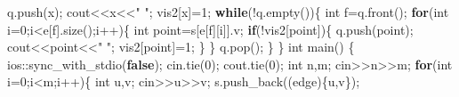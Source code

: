 \documentclass[
]{article}
\newenvironment{Shaded}{}{}
\newcommand{\ControlFlowTok}[1]{\textcolor[rgb]{0.00,0.44,0.13}{\textbf{#1}}}
\newcommand{\DataTypeTok}[1]{\textcolor[rgb]{0.56,0.13,0.00}{#1}}
\newcommand{\DecValTok}[1]{\textcolor[rgb]{0.25,0.63,0.44}{#1}}
\newcommand{\KeywordTok}[1]{\textcolor[rgb]{0.00,0.44,0.13}{\textbf{#1}}}
\newcommand{\NormalTok}[1]{#1}
\newcommand{\OperatorTok}[1]{\textcolor[rgb]{0.40,0.40,0.40}{#1}}
\newcommand{\StringTok}[1]{\textcolor[rgb]{0.25,0.44,0.63}{#1}}
\begin{document}
\begin{Shaded}
\begin{Highlighting}[]
\NormalTok{	q}\OperatorTok{.}\NormalTok{push}\OperatorTok{(}\NormalTok{x}\OperatorTok{);}
\NormalTok{	cout}\OperatorTok{\textless{}\textless{}}\NormalTok{x}\OperatorTok{\textless{}\textless{}}\StringTok{" "}\OperatorTok{;}
\NormalTok{	vis2}\OperatorTok{[}\NormalTok{x}\OperatorTok{]=}\DecValTok{1}\OperatorTok{;}
	\ControlFlowTok{while}\OperatorTok{(!}\NormalTok{q}\OperatorTok{.}\NormalTok{empty}\OperatorTok{())\{}
		\DataTypeTok{int}\NormalTok{ f}\OperatorTok{=}\NormalTok{q}\OperatorTok{.}\NormalTok{front}\OperatorTok{();}
		\ControlFlowTok{for}\OperatorTok{(}\DataTypeTok{int}\NormalTok{ i}\OperatorTok{=}\DecValTok{0}\OperatorTok{;}\NormalTok{i}\OperatorTok{\textless{}}\NormalTok{e}\OperatorTok{[}\NormalTok{f}\OperatorTok{].}\NormalTok{size}\OperatorTok{();}\NormalTok{i}\OperatorTok{++)\{}
			\DataTypeTok{int}\NormalTok{ point}\OperatorTok{=}\NormalTok{s}\OperatorTok{[}\NormalTok{e}\OperatorTok{[}\NormalTok{f}\OperatorTok{][}\NormalTok{i}\OperatorTok{]].}\NormalTok{v}\OperatorTok{;}
			\ControlFlowTok{if}\OperatorTok{(!}\NormalTok{vis2}\OperatorTok{[}\NormalTok{point}\OperatorTok{])\{}
\NormalTok{				q}\OperatorTok{.}\NormalTok{push}\OperatorTok{(}\NormalTok{point}\OperatorTok{);}
\NormalTok{				cout}\OperatorTok{\textless{}\textless{}}\NormalTok{point}\OperatorTok{\textless{}\textless{}}\StringTok{" "}\OperatorTok{;}
\NormalTok{				vis2}\OperatorTok{[}\NormalTok{point}\OperatorTok{]=}\DecValTok{1}\OperatorTok{;}
			\OperatorTok{\}}
		\OperatorTok{\}}
\NormalTok{		q}\OperatorTok{.}\NormalTok{pop}\OperatorTok{();}
	\OperatorTok{\}}
\OperatorTok{\}}
\DataTypeTok{int}\NormalTok{ main}\OperatorTok{()}
\OperatorTok{\{}
\NormalTok{	ios}\OperatorTok{::}\NormalTok{sync\_with\_stdio}\OperatorTok{(}\KeywordTok{false}\OperatorTok{);}\NormalTok{ cin}\OperatorTok{.}\NormalTok{tie}\OperatorTok{(}\DecValTok{0}\OperatorTok{);}\NormalTok{ cout}\OperatorTok{.}\NormalTok{tie}\OperatorTok{(}\DecValTok{0}\OperatorTok{);}
	\DataTypeTok{int}\NormalTok{ n}\OperatorTok{,}\NormalTok{m}\OperatorTok{;}
\NormalTok{	cin}\OperatorTok{\textgreater{}\textgreater{}}\NormalTok{n}\OperatorTok{\textgreater{}\textgreater{}}\NormalTok{m}\OperatorTok{;}
	\ControlFlowTok{for}\OperatorTok{(}\DataTypeTok{int}\NormalTok{ i}\OperatorTok{=}\DecValTok{0}\OperatorTok{;}\NormalTok{i}\OperatorTok{\textless{}}\NormalTok{m}\OperatorTok{;}\NormalTok{i}\OperatorTok{++)\{}
		\DataTypeTok{int}\NormalTok{ u}\OperatorTok{,}\NormalTok{v}\OperatorTok{;}
\NormalTok{		cin}\OperatorTok{\textgreater{}\textgreater{}}\NormalTok{u}\OperatorTok{\textgreater{}\textgreater{}}\NormalTok{v}\OperatorTok{;}
\NormalTok{		s}\OperatorTok{.}\NormalTok{push\_back}\OperatorTok{((}\NormalTok{edge}\OperatorTok{)\{}\NormalTok{u}\OperatorTok{,}\NormalTok{v}\OperatorTok{\});}

\end{Highlighting}
\end{Shaded}
\end{document}
